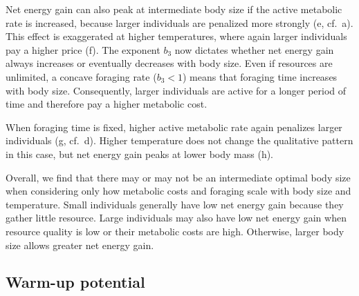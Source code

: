 Net energy gain can also peak at intermediate body size if the active metabolic rate is increased, because larger individuals are penalized more strongly (e, cf.~a).
This effect is exaggerated at higher temperatures, where again larger individuals pay a higher price (f).
The exponent $b_3$ now dictates whether net energy gain always increases or eventually decreases with body size.
Even if resources are unlimited, a concave foraging rate ($b_3 < 1$) means that foraging time increases with body size.
Consequently, larger individuals are active for a longer period of time and therefore pay a higher metabolic cost.

When foraging time is fixed, higher active metabolic rate again penalizes larger individuals (g, cf.~d).
Higher temperature does not change the qualitative pattern in this case, but net energy gain peaks at lower body mass (h).

Overall, we find that there may or may not be an intermediate optimal body size when considering only how metabolic costs and foraging scale with body size and temperature.
Small individuals generally have low net energy gain because they gather little resource.
Large individuals may also have low net energy gain when resource quality is low or their metabolic costs are high.
Otherwise, larger body size allows greater net energy gain.


\subsection*{Warm-up potential}

